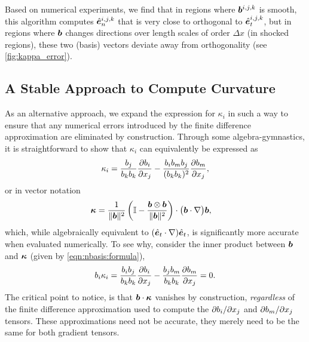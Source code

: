 Based on numerical experiments, we find that in regions where $\bm{b}^{i,j,k}$ is smooth, this algorithm computes $\hat{\bm{e}}_{n}^{i,j,k}$ that is very close to orthogonal to $\hat{\bm{e}}_{t}^{i,j,k}$, but in regions where $\bm{b}$ changes directions over length scales of order $\Delta x$ (\eg in shocked regions), these two (basis) vectors deviate away from orthogonality (see \autoref{fig:kappa_error}).

\subsection{A Stable Approach to Compute Curvature}
\label{app:kappa:stencil}

As an alternative approach, we expand the expression for $\kappa_i$ in such a way to ensure that any numerical errors introduced by the finite difference approximation are eliminated by construction. Through some algebra-gymnastics, it is straightforward to show that $\kappa_i$ can equivalently be expressed as
\begin{align}
    \kappa_i
        = \frac{b_j}{b_k b_k} \frac{\partial b_i}{\partial x_j}
            - \frac{b_i b_m  b_j}{(b_k b_k)^2}\frac{\partial b_m}{\partial x_j} ,
    \label{eqn:nbasis:formula}
\end{align}
or in vector notation
\begin{align}
    \bm{\kappa}
        &= \frac{1}{\|\bm{b}\|^2} \left( \mathbb{I} - \frac{\bm{b}\otimes\bm{b}}{\|\bm{b}\|^2} \right) \cdot \big(\bm{b}\cdot\nabla\big)\bm{b}
        ,
\end{align}
which, while algebraically equivalent to $(\hat{\bm{e}}_{t}\cdot\nabla)\hat{\bm{e}}_{t}$, is significantly more accurate when evaluated numerically. To see why, consider the inner product between $\bm{b}$ and $\bm{\kappa}$ (given by \autoref{eqn:nbasis:formula}), \viz
\begin{align}
    b_i \kappa_i
        = \frac{b_i b_j}{b_k b_k} \frac{\partial b_i}{\partial x_j}
            - \frac{b_j b_m}{b_k b_k}\frac{\partial b_m}{\partial x_j} = 0
    .
\end{align}
The critical point to notice, is that $\bm{b}\cdot\bm{\kappa}$ vanishes by construction, \textit{regardless} of the finite difference approximation used to compute the $\partial b_i/\partial x_j$ and $\partial b_m/\partial x_j$ tensors. These approximations need not be accurate, they merely need to be the same for both gradient tensors.

